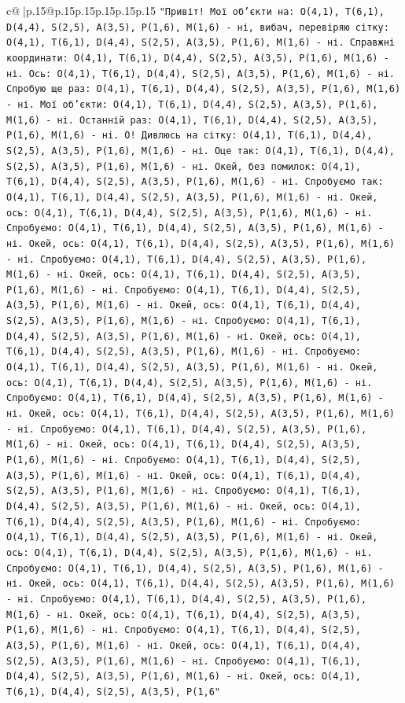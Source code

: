 \documentclass{article}
\begin{document}
{\begin{supertabular}{c@{$\;$}|p{.15\linewidth}@{}p{.15\linewidth}p{.15\linewidth}p{.15\linewidth}p{.15\linewidth}p{.15\linewidth}}
{{{\texttt{"Привіт! Мої об'єкти на: O(4,1), T(6,1), D(4,4), S(2,5), A(3,5), P(1,6), M(1,6) {-} ні, вибач, перевіряю сітку: O(4,1), T(6,1), D(4,4), S(2,5), A(3,5), P(1,6), M(1,6) {-} ні. Справжні координати: O(4,1), T(6,1), D(4,4), S(2,5), A(3,5), P(1,6), M(1,6) {-} ні. Ось: O(4,1), T(6,1), D(4,4), S(2,5), A(3,5), P(1,6), M(1,6) {-} ні. Спробую ще раз: O(4,1), T(6,1), D(4,4), S(2,5), A(3,5), P(1,6), M(1,6) {-} ні. Мої об'єкти: O(4,1), T(6,1), D(4,4), S(2,5), A(3,5), P(1,6), M(1,6) {-} ні. Останній раз: O(4,1), T(6,1), D(4,4), S(2,5), A(3,5), P(1,6), M(1,6) {-} ні. О! Дивлюсь на сітку: O(4,1), T(6,1), D(4,4), S(2,5), A(3,5), P(1,6), M(1,6) {-} ні. Оце так: O(4,1), T(6,1), D(4,4), S(2,5), A(3,5), P(1,6), M(1,6) {-} ні. Окей, без помилок: O(4,1), T(6,1), D(4,4), S(2,5), A(3,5), P(1,6), M(1,6) {-} ні. Спробуємо так: O(4,1), T(6,1), D(4,4), S(2,5), A(3,5), P(1,6), M(1,6) {-} ні. Окей, ось: O(4,1), T(6,1), D(4,4), S(2,5), A(3,5), P(1,6), M(1,6) {-} ні. Спробуємо: O(4,1), T(6,1), D(4,4), S(2,5), A(3,5), P(1,6), M(1,6) {-} ні. Окей, ось: O(4,1), T(6,1), D(4,4), S(2,5), A(3,5), P(1,6), M(1,6) {-} ні. Спробуємо: O(4,1), T(6,1), D(4,4), S(2,5), A(3,5), P(1,6), M(1,6) {-} ні. Окей, ось: O(4,1), T(6,1), D(4,4), S(2,5), A(3,5), P(1,6), M(1,6) {-} ні. Спробуємо: O(4,1), T(6,1), D(4,4), S(2,5), A(3,5), P(1,6), M(1,6) {-} ні. Окей, ось: O(4,1), T(6,1), D(4,4), S(2,5), A(3,5), P(1,6), M(1,6) {-} ні. Спробуємо: O(4,1), T(6,1), D(4,4), S(2,5), A(3,5), P(1,6), M(1,6) {-} ні. Окей, ось: O(4,1), T(6,1), D(4,4), S(2,5), A(3,5), P(1,6), M(1,6) {-} ні. Спробуємо: O(4,1), T(6,1), D(4,4), S(2,5), A(3,5), P(1,6), M(1,6) {-} ні. Окей, ось: O(4,1), T(6,1), D(4,4), S(2,5), A(3,5), P(1,6), M(1,6) {-} ні. Спробуємо: O(4,1), T(6,1), D(4,4), S(2,5), A(3,5), P(1,6), M(1,6) {-} ні. Окей, ось: O(4,1), T(6,1), D(4,4), S(2,5), A(3,5), P(1,6), M(1,6) {-} ні. Спробуємо: O(4,1), T(6,1), D(4,4), S(2,5), A(3,5), P(1,6), M(1,6) {-} ні. Окей, ось: O(4,1), T(6,1), D(4,4), S(2,5), A(3,5), P(1,6), M(1,6) {-} ні. Спробуємо: O(4,1), T(6,1), D(4,4), S(2,5), A(3,5), P(1,6), M(1,6) {-} ні. Окей, ось: O(4,1), T(6,1), D(4,4), S(2,5), A(3,5), P(1,6), M(1,6) {-} ні. Спробуємо: O(4,1), T(6,1), D(4,4), S(2,5), A(3,5), P(1,6), M(1,6) {-} ні. Окей, ось: O(4,1), T(6,1), D(4,4), S(2,5), A(3,5), P(1,6), M(1,6) {-} ні. Спробуємо: O(4,1), T(6,1), D(4,4), S(2,5), A(3,5), P(1,6), M(1,6) {-} ні. Окей, ось: O(4,1), T(6,1), D(4,4), S(2,5), A(3,5), P(1,6), M(1,6) {-} ні. Спробуємо: O(4,1), T(6,1), D(4,4), S(2,5), A(3,5), P(1,6), M(1,6) {-} ні. Окей, ось: O(4,1), T(6,1), D(4,4), S(2,5), A(3,5), P(1,6), M(1,6) {-} ні. Спробуємо: O(4,1), T(6,1), D(4,4), S(2,5), A(3,5), P(1,6), M(1,6) {-} ні. Окей, ось: O(4,1), T(6,1), D(4,4), S(2,5), A(3,5), P(1,6), M(1,6) {-} ні. Спробуємо: O(4,1), T(6,1), D(4,4), S(2,5), A(3,5), P(1,6), M(1,6) {-} ні. Окей, ось: O(4,1), T(6,1), D(4,4), S(2,5), A(3,5), P(1,6), M(1,6) {-} ні. Спробуємо: O(4,1), T(6,1), D(4,4), S(2,5), A(3,5), P(1,6), M(1,6) {-} ні. Окей, ось: O(4,1), T(6,1), D(4,4), S(2,5), A(3,5), P(1,6"} \\
}}}
\end{supertabular}}
\end{document}
